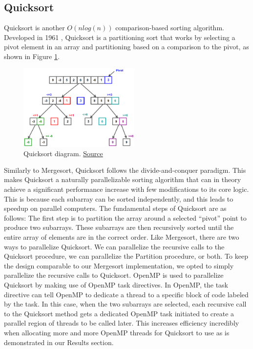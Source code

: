 \documentclass[conference]{IEEEtran}
\begin{document}
    \subsection{Quicksort}
    Quicksort is another $O(nlog(n))$ comparison-based sorting algorithm.
    Developed in 1961 \cite{hoare_algorithm_1961}, Quicksort is a partitioning sort that works by selecting a pivot element in an array and partitioning based on a comparison to the pivot, as shown in Figure \ref{qck}. 
    \begin{figure}[h]
        \includegraphics[width=6cm]{Quicksort.png} 
        \caption{Quicksort diagram. \href{https://www.techiedelight.com/quicksort/}{Source}}
        \label{qck}
    \end{figure}
    Similarly to Mergesort, Quicksort follows the divide-and-conquer paradigm. This makes Quicksort a naturally parallelizable sorting algorithm that can in theory achieve a significant performance increase with few modifications to its core logic. \cite{blelloch_programming_1996}
    This is because each subarray can be sorted independently, and this leads to speedup on parallel computers.
    The fundamental steps of Quicksort are as follows: The first step is to partition the array around a selected “pivot” point to produce two subarrays. These subarrays are then recursively sorted until the entire array of elements are in the correct order. Like Mergesort, there are two ways to parallelize Quicksort.
	We can parallelize the recursive calls to the Quicksort procedure, we can parallelize the Partition procedure, or both. To keep the design comparable to our Mergesort implementation, we opted to simply parallelize the recursive calls to Quicksort. OpenMP is used to parallelize Quicksort by making use of
	OpenMP task directives. In OpenMP, the task directive can tell OpenMP to dedicate a
	thread to a specific block of code labeled by the task. In this case, when the two subarrays are selected, each recursive call to the Quicksort method gets a dedicated OpenMP task initiated to create a parallel region of threads to be called later. This increases efficiency incredibly when allocating more and more OpenMP threads for Quicksort to use as is demonstrated in our Results section.
\end{document}
